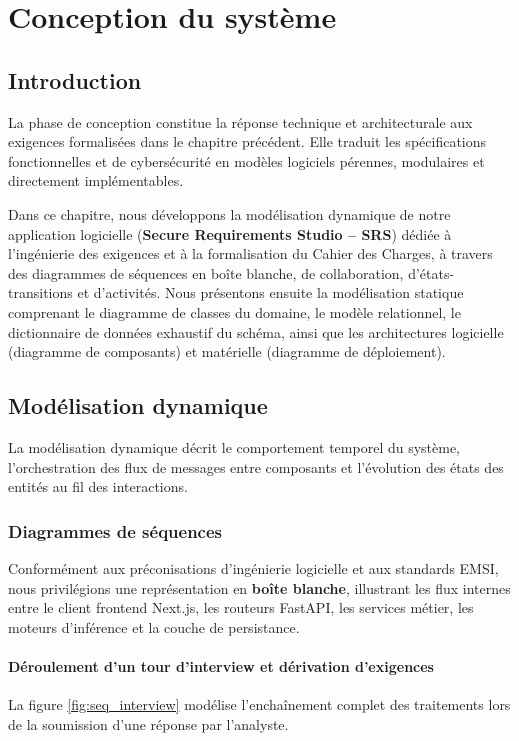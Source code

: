 \chapter{Conception du système}

\section{Introduction}

La phase de conception constitue la réponse technique et architecturale aux exigences formalisées dans le chapitre précédent. Elle traduit les spécifications fonctionnelles et de cybersécurité en modèles logiciels pérennes, modulaires et directement implémentables. 

Dans ce chapitre, nous développons la modélisation dynamique de notre application logicielle (\textbf{Secure Requirements Studio -- SRS}) dédiée à l'ingénierie des exigences et à la formalisation du Cahier des Charges, à travers des diagrammes de séquences en boîte blanche, de collaboration, d'états-transitions et d'activités. Nous présentons ensuite la modélisation statique comprenant le diagramme de classes du domaine, le modèle relationnel, le dictionnaire de données exhaustif du schéma, ainsi que les architectures logicielle (diagramme de composants) et matérielle (diagramme de déploiement).

\section{Modélisation dynamique}

La modélisation dynamique décrit le comportement temporel du système, l'orchestration des flux de messages entre composants et l'évolution des états des entités au fil des interactions.

\subsection{Diagrammes de séquences}

Conformément aux préconisations d'ingénierie logicielle et aux standards EMSI, nous privilégions une représentation en \textbf{boîte blanche}, illustrant les flux internes entre le client frontend Next.js, les routeurs FastAPI, les services métier, les moteurs d'inférence et la couche de persistance.

\subsubsection{Déroulement d'un tour d'interview et dérivation d'exigences}
La figure \ref{fig:seq_interview} modélise l'enchaînement complet des traitements lors de la soumission d'une réponse par l'analyste.


